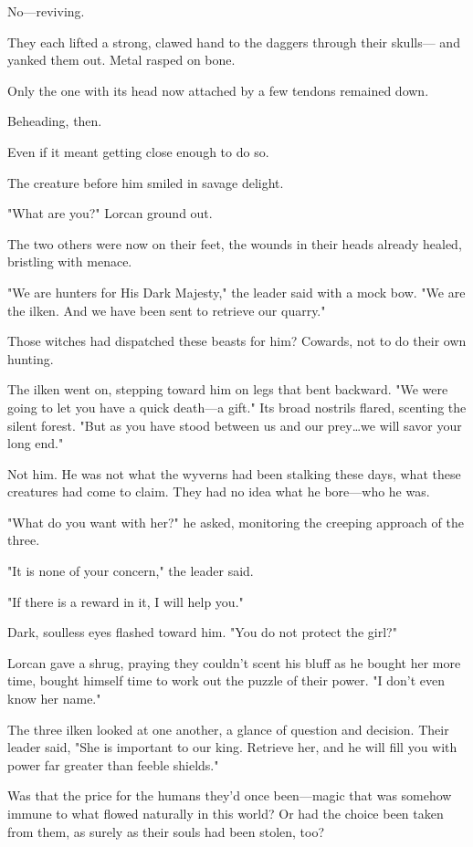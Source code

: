 No---reviving.

They each lifted a strong, clawed hand to the daggers through their skulls--- and yanked them out.
Metal rasped on bone.

Only the one with its head now attached by a few tendons remained down.

Beheading, then.

Even if it meant getting close enough to do so.

The creature before him smiled in savage delight.

"What are you?"
Lorcan ground out.

The two others were now on their feet, the wounds in their heads already healed, bristling with menace.

"We are hunters for His Dark Majesty," the leader said with a mock bow.
"We are the ilken.
And we have been sent to retrieve our quarry."

Those witches had dispatched these beasts for him?
Cowards, not to do their own hunting.

The ilken went on, stepping toward him on legs that bent backward.
"We were going to let you have a quick death---a gift."
Its broad nostrils flared, scenting the silent forest.
"But as you have stood between us and our prey\ldots we will savor your long end."

Not him.
He was not what the wyverns had been stalking these days, what these creatures had come to claim.
They had no idea what he bore---who he was.

"What do you want with her?"
he asked, monitoring the creeping approach of the three.

"It is none of your concern," the leader said.

"If there is a reward in it, I will help you."

Dark, soulless eyes flashed toward him.
"You do not protect the girl?"

Lorcan gave a shrug, praying they couldn't scent his bluff as he bought her more time, bought himself time to work out the puzzle of their power.
"I don't even know her name."

The three ilken looked at one another, a glance of question and decision.
Their leader said, "She is important to our king.
Retrieve her, and he will fill you with power far greater than feeble shields."

Was that the price for the humans they'd once been---magic that was somehow immune to what flowed naturally in this world?
Or had the choice been taken from them, as surely as their souls had been stolen, too?


